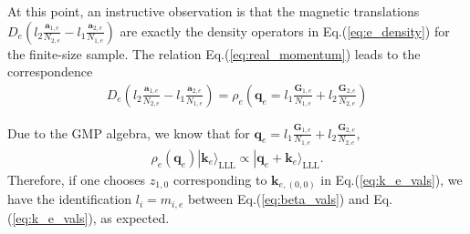 At this point, an instructive observation is that the magnetic translations $D_e(l_2\frac{\mathbf a_{1,e}}{N_{2,e}}-l_1\frac{\mathbf a_{2,e}}{N_{1,e}})$ are exactly the density operators in Eq.(\ref{eq:e_density}) for the finite-size sample. The relation Eq.(\ref{eq:real_momentum}) leads to the correspondence
\begin{align}
D_e\left(l_2\frac{\mathbf a_{1,e}}{N_{2,e}}-l_1\frac{\mathbf a_{2,e}}{N_{1,e}}\right)=\rho_e\left(\mathbf q_e= l_1\frac{\mathbf G_{1,e}}{N_{1,e}} + l_2\frac{\mathbf G_{2,e}}{N_{2,e}}\right)\label{eq:mag_transl_vs_density}
\end{align}

Due to the GMP algebra, we know that for $\mathbf q_e=l_1\frac{\mathbf G_{1,e}}{N_{1,e}} + l_2\frac{\mathbf G_{2,e}}{N_{2,e}}$, 
\begin{align}
\rho_e(\mathbf q_e)|\mathbf k_e\rangle_{\text{LLL}} \propto |\mathbf q_e+\mathbf k_e\rangle_{\text{LLL}}.
\end{align}
Therefore, if one chooses $z_{1,0}$ corresponding to $\mathbf k_{e,(0,0)}$ in Eq.(\ref{eq:k_e_vals}), we have the identification $l_i=m_{i,e}$ between Eq.(\ref{eq:beta_vals}) and Eq.(\ref{eq:k_e_vals}), as expected.

